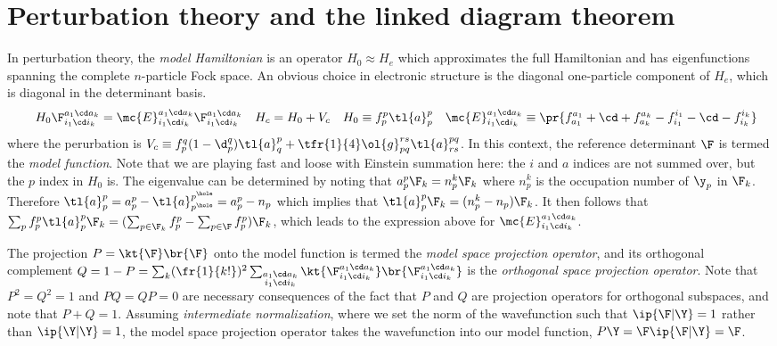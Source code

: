 \documentclass[11pt,fleqn]{article}
\numberwithin{equation}{section}
\begin{document}
\section{Perturbation theory and the linked diagram theorem}\label{sec:rspt}

\begin{dfn}\label{dfn:model-hamiltonian}
In perturbation theory, the \textit{model Hamiltonian} is an operator $H_0\approx H_e$ which approximates the full Hamiltonian and has eigenfunctions spanning the complete $n$-particle Fock space.
An obvious choice in electronic structure is the diagonal one-particle component of $H_e$, which is diagonal in the determinant basis.
\begin{align*}
&&
  H_0
  \F_{i_1\cd i_k}^{a_1\cd a_k}
=
  \mc{E}_{i_1\cd i_k}^{a_1\cd a_k}
  \F_{i_1\cd i_k}^{a_1\cd a_k}
&&
  H_c
=
  H_0
+
  V_c
&&
  H_0
\equiv
  f_p^p\tl{a}^p_p
&&
  \mc{E}_{i_1\cd i_k}^{a_1\cd a_k}
\equiv
\pr{
  f_{a_1}^{a_1}
+
  \cd
+
  f_{a_k}^{a_k}
-
  f_{i_1}^{i_1}
-
  \cd
-
  f_{i_k}^{i_k}
}
\end{align*}
where the perurbation is
$
  V_c
\equiv
  f_p^q(1-\d_p^q)
  \tl{a}^p_q
+
  \tfr{1}{4}
  \ol{g}_{pq}^{rs}
  \tl{a}^{pq}_{rs}
$.
In this context, the reference determinant $\F$ is termed the \textit{model function}.
Note that we are playing fast and loose with Einstein summation here: the $i$ and $a$ indices are not summed over, but the $p$ index in $H_0$ is.
The eigenvalue can be determined by noting that $a^p_p\F_k=n_p^k\F_k$ where $n_p^k$ is the occupation number of $\y_p$ in $\F_k$.
Therefore $\tl{a}^p_p=a^p_p-\tl{a}^{p^\hole}_{p^\hole}=a^p_p - n_p$ which implies that $\tl{a}^p_p\F_k=(n_p^k-n_p)\F_k$.
It then follows that
$
  \sum_p
  f_p^p
  \tl{a}^p_p
  \F_k
=
(
  \sum_{p\in \F_k}
  f_p^p
-
  \sum_{p\in \F}
  f_p^p
)
\F_k
$,
which leads to the expression above for $\mc{E}_{i_1\cd i_k}^{a_1\cd a_k}$.
\end{dfn}


\begin{dfn}\label{dfn:model-function}
The projection $P=\kt{\F}\br{\F}$ onto the model function is termed the \textit{model space projection operator}, and its orthogonal complement $Q=1-P=\sum_k(\fr{1}{k!})^2\sum_{\substack{a_1\cd a_k\\i_1\cd i_k}}\kt{\F_{i_1\cd i_k}^{a_1\cd a_k}}\br{\F_{i_1\cd i_k}^{a_1\cd a_k}}$ is the \textit{orthogonal space projection operator}.
Note that $P^2=Q^2=1$ and $PQ=QP=0$ are necessary consequences of the fact that $P$ and $Q$ are projection operators for orthogonal subspaces, and note that $P+Q=1$.
Assuming \textit{intermediate normalization}, where we set the norm of the wavefunction such that $\ip{\F|\Y}=1$ rather than $\ip{\Y|\Y}=1$, the model space projection operator takes the wavefunction into our model function, $P\Y=\F\ip{\F|\Y}=\F$.
\end{dfn}
\end{document}
